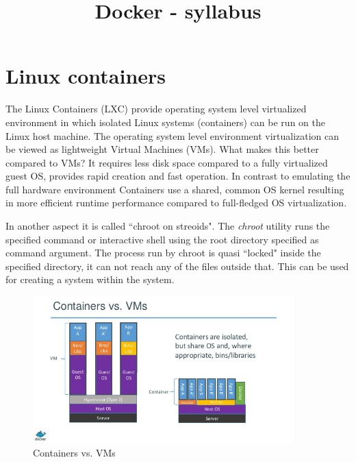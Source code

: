 \documentclass[a4paper]{article}
\title{Docker - syllabus}
\author{}
\date{}
\begin{document}
\maketitle

\tableofcontents

\section{Linux containers}
The Linux Containers (LXC) provide operating system level virtualized environment in which isolated Linux systems
(containers) can be run on the Linux host machine. The operating system level environment virtualization can be viewed
as lightweight Virtual Machines (VMs). What makes this better compared to VMs? It requires less disk space compared
to a fully virtualized guest OS, provides rapid creation and fast operation. In contrast to emulating the full hardware
environment Containers use a shared, common OS kernel resulting in more efficient runtime performance compared to
full-fledged OS virtualization.

In another aspect it is called ``chroot on streoids". The \emph{chroot} utility runs the specified command or
interactive shell using the root directory specified as command argument. The process run by chroot is quasi ``locked"
inside the specified directory, it can not reach any of the files outside that. This can be used for creating a system
within the system.

\begin{figure}[H]
    \centering
    \includegraphics[width=0.9\textwidth]{figures/container_vs_vm.png}
    \caption{Containers vs. VMs}
    \label{fig:containers}
\end{figure}
\end{document}
